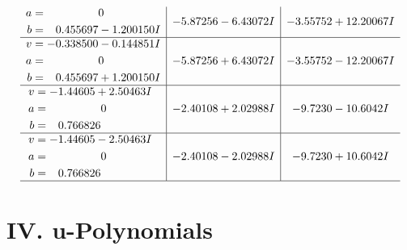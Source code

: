 \documentclass[1p]{elsarticle_modified}
\theoremstyle{definition}
\begin{document}
$$\begin{array}{c|c|c}
\begin{aligned}
a &= \phantom{-0.000000 } 0 \\
b &= \phantom{-}0.455697 - 1.200150 I\end{aligned}
 & -5.87256 - 6.43072 I & -3.55752 + 12.20067 I \\ \hline\begin{aligned}
v &= -0.338500 - 0.144851 I \\
a &= \phantom{-0.000000 } 0 \\
b &= \phantom{-}0.455697 + 1.200150 I\end{aligned}
 & -5.87256 + 6.43072 I & -3.55752 - 12.20067 I \\ \hline\begin{aligned}
v &= -1.44605 + 2.50463 I \\
a &= \phantom{-0.000000 } 0 \\
b &= \phantom{-}0.766826\phantom{ +0.000000I}\end{aligned}
 & -2.40108 + 2.02988 I & -9.7230 - 10.6042 I \\ \hline\begin{aligned}
v &= -1.44605 - 2.50463 I \\
a &= \phantom{-0.000000 } 0 \\
b &= \phantom{-}0.766826\phantom{ +0.000000I}\end{aligned}
 & -2.40108 - 2.02988 I & -9.7230 + 10.6042 I\\
 \hline 
 \end{array}$$\newpage
\newpage\renewcommand{\arraystretch}{1}
\centering \section*{ IV. u-Polynomials}
\end{document}

